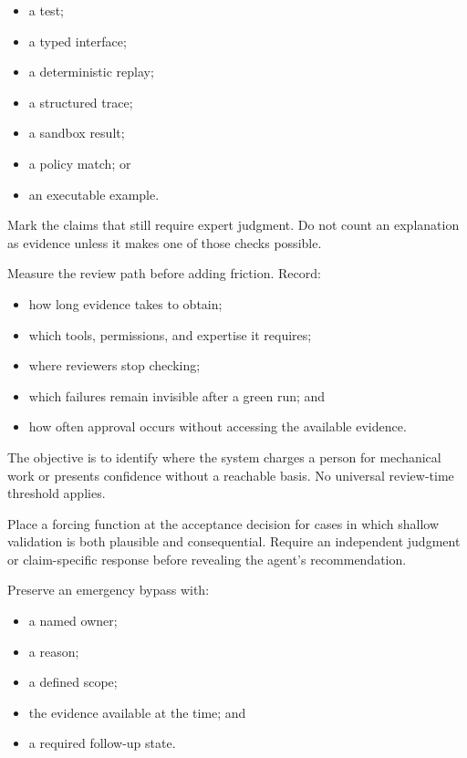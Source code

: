 \begin{itemize}
\tightlist
\item
  a test;
\item
  a typed interface;
\item
  a deterministic replay;
\item
  a structured trace;
\item
  a sandbox result;
\item
  a policy match; or
\item
  an executable example.
\end{itemize}

Mark the claims that still require expert judgment. Do not count an explanation as evidence unless it makes one of those checks possible.

Measure the review path before adding friction. Record:

\begin{itemize}
\tightlist
\item
  how long evidence takes to obtain;
\item
  which tools, permissions, and expertise it requires;
\item
  where reviewers stop checking;
\item
  which failures remain invisible after a green run; and
\item
  how often approval occurs without accessing the available evidence.
\end{itemize}

The objective is to identify where the system charges a person for mechanical work or presents confidence without a reachable basis. No universal review-time threshold applies.

Place a forcing function at the acceptance decision for cases in which shallow validation is both plausible and consequential. Require an independent judgment or claim-specific response before revealing the agent's recommendation.

Preserve an emergency bypass with:

\begin{itemize}
\tightlist
\item
  a named owner;
\item
  a reason;
\item
  a defined scope;
\item
  the evidence available at the time; and
\item
  a required follow-up state.
\end{itemize}

